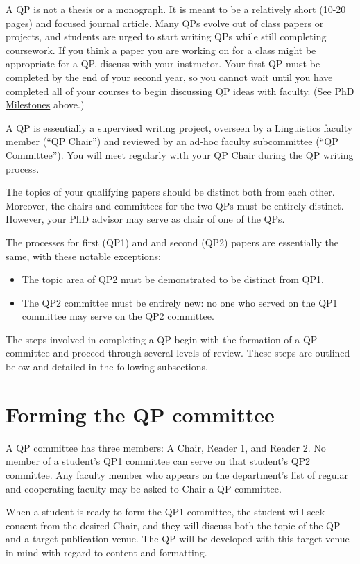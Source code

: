 \documentclass[
]{book}
\providecommand{\tightlist}{%
  \setlength{\itemsep}{0pt}\setlength{\parskip}{0pt}}
\begin{document}
A QP is not a thesis or a monograph. It is meant to be a relatively short (10-20 pages) and focused journal article. Many QPs evolve out of class papers or projects, and students are urged to start writing QPs while still completing coursework. If you think a paper you are working on for a class might be appropriate for a QP, discuss with your instructor. Your first QP must be completed by the end of your second year, so you cannot wait until you have completed all of your courses to begin discussing QP ideas with faculty. (See \hyperref[phdprogram]{PhD Milestones} above.)

A QP is essentially a supervised writing project, overseen by a Linguistics faculty member (``QP Chair'') and reviewed by an ad-hoc faculty subcommittee (``QP Committee''). You will meet regularly with your QP Chair during the QP writing process.

The topics of your qualifying papers should be distinct both from each other. Moreover, the chairs and committees for the two QPs must be entirely distinct. However, your PhD advisor may serve as chair of one of the QPs.

The processes for first (QP1) and and second (QP2) papers are essentially the same, with these notable exceptions:

\begin{itemize}
\tightlist
\item
  The topic area of QP2 must be demonstrated to be distinct from QP1.
\item
  The QP2 committee must be entirely new: no one who served on the QP1 committee may serve on the QP2 committee.
\end{itemize}

The steps involved in completing a QP begin with the formation of a QP committee and proceed through several levels of review. These steps are outlined below and detailed in the following subsections.

\section{Forming the QP committee}\label{QP_committee}

A QP committee has three members: A Chair, Reader 1, and Reader 2. No member of a student's QP1 committee can serve on that student's QP2 committee. Any faculty member who appears on the department's list of regular and cooperating faculty may be asked to Chair a QP committee.

When a student is ready to form the QP1 committee, the student will seek consent from the desired Chair, and they will discuss both the topic of the QP and a target publication venue. The QP will be developed with this target venue in mind with regard to content and formatting.
\end{document}
